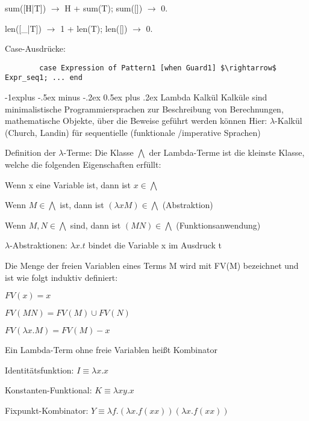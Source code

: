 \documentclass[10pt]{article}
\makeatletter
\renewcommand{\subsection}{\@startsection{subsection}{2}{0mm}%
                                {-1explus -.5ex minus -.2ex}%
                                {0.5ex plus .2ex}%
                                {\normalfont\normalsize\bfseries}}
\makeatother
\begin{document}
\begin{itemize*}
\begin{itemize*}
\begin{itemize*}
    \item sum([H|T]) $\rightarrow$ H + sum(T); sum([]) $\rightarrow$ 0.
    \item len([\_|T]) $\rightarrow$ 1 + len(T); len([]) $\rightarrow$ 0.
  \end{itemize*}
  \item Case-Ausdrücke:
  \begin{lstlisting} 
        case Expression of Pattern1 [when Guard1] $\rightarrow$ Expr_seq1; ... end 
    \end{lstlisting}
\end{itemize*}


\subsection{Lambda Kalkül}
Kalküle sind minimalistische Programmiersprachen zur Beschreibung von Berechnungen, mathematische Objekte, über die Beweise geführt werden können
Hier: $\lambda$-Kalkül (Church, Landin) für sequentielle (funktionale /imperative Sprachen)

Definition der $\lambda$-Terme:
Die Klasse $\bigwedge$ der Lambda-Terme ist die kleinste Klasse, welche die folgenden Eigenschaften erfüllt:
\begin{itemize*}
  \item Wenn x eine Variable ist, dann ist $x \in \bigwedge$
  \item Wenn $M \in \bigwedge$ ist, dann ist $(\lambda xM) \in \bigwedge$ (Abstraktion)
  \item Wenn $M, N \in \bigwedge$ sind, dann ist $(MN) \in \bigwedge$ (Funktionsanwendung)
\end{itemize*}


$\lambda$-Abstraktionen: $\lambda x. t$ bindet die Variable x im Ausdruck t

Die Menge der freien Variablen eines Terms M wird mit FV(M) bezeichnet und ist wie folgt induktiv definiert:
\begin{itemize*}
  \item $FV(x)={x}$
  \item $FV(MN) = FV(M) \cup FV(N)$
  \item $FV(\lambda x.M) = FV(M) - {x}$
\end{itemize*}
Ein Lambda-Term ohne freie Variablen heißt Kombinator
\begin{itemize*}
  \item Identitätsfunktion: $I \equiv  \lambda x.x$
  \item Konstanten-Funktional: $K \equiv \lambda xy.x$
  \item Fixpunkt-Kombinator: $Y \equiv \lambda f.(\lambda x. f (x x)) (\lambda x. f (x x))$
\end{itemize*}


\end{itemize*}
\end{document}
